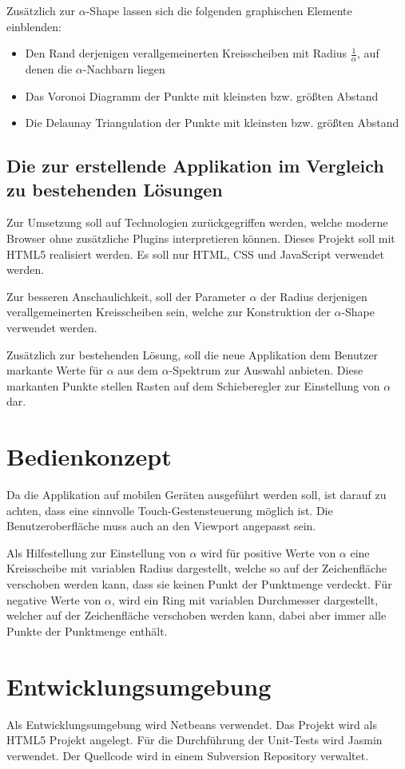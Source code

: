 \documentclass[12pt,a4paper]{scrartcl}
\begin{document}
Zusätzlich zur $\alpha$-Shape lassen sich die folgenden graphischen Elemente einblenden:
\begin{itemize}
\item Den Rand derjenigen verallgemeinerten Kreisscheiben mit Radius $\frac{1}{\alpha}$, auf denen die
$\alpha$-Nachbarn liegen
\item Das Voronoi Diagramm der Punkte mit kleinsten bzw. größten Abstand
\item Die Delaunay Triangulation der Punkte mit kleinsten bzw. größten Abstand
\end{itemize}

\subsection*{Die zur erstellende Applikation im Vergleich zu bestehenden Lösungen}
Zur Umsetzung soll auf Technologien zurückgegriffen werden, welche moderne Browser ohne zusätzliche
Plugins interpretieren können. Dieses Projekt soll mit HTML5 realisiert werden. Es soll nur HTML, CSS und
JavaScript verwendet werden.

Zur besseren Anschaulichkeit, soll der Parameter $\alpha$ der Radius derjenigen verallgemeinerten Kreisscheiben
sein, welche zur Konstruktion der $\alpha$-Shape verwendet werden.

Zusätzlich zur bestehenden Lösung, soll die neue Applikation dem Benutzer markante Werte für $\alpha$ aus
dem $\alpha$-Spektrum zur Auswahl anbieten. Diese markanten Punkte stellen Rasten auf dem Schieberegler
zur Einstellung von $\alpha$ dar.

\section*{Bedienkonzept}
Da die Applikation auf mobilen Geräten ausgeführt werden soll, ist darauf zu achten, dass eine sinnvolle
Touch-Gestensteuerung möglich ist. Die Benutzeroberfläche muss auch an den Viewport angepasst sein.

Als Hilfestellung zur Einstellung von $\alpha$ wird für positive Werte von $\alpha$ eine Kreisscheibe mit variablen
Radius dargestellt, welche so auf der Zeichenfläche verschoben werden kann, dass sie keinen Punkt der Punktmenge
verdeckt.
Für negative Werte von $\alpha$, wird ein Ring mit variablen Durchmesser dargestellt, welcher auf der Zeichenfläche
verschoben werden kann, dabei aber immer alle Punkte der Punktmenge enthält.

\section*{Entwicklungsumgebung}
Als Entwicklungsumgebung wird Netbeans verwendet. Das Projekt wird als HTML5 Projekt angelegt. Für die Durchführung
der Unit-Tests wird Jasmin \cite{jasmin_test} verwendet. Der Quellcode wird in einem Subversion Repository verwaltet.
\end{document}
